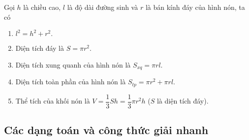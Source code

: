 \begin{dl}
Gọi $h$ là chiều cao, $l$ là độ dài đường sinh và $r$ là bán kính đáy của hình nón, ta có
\begin{enumerate}
\item $l^2=h^2+r^2.$
\item Diện tích đáy là $S=\pi r^2.$
\item Diện tích xung quanh của hình nón là $S_{xq}=\pi rl.$
\item Diện tích toàn phần của hình nón là $S_{tp}=\pi r^2+\pi rl.$
\item Thể tích của khối nón là $V=\dfrac{1}{3}Sh=\dfrac{1}{3}\pi r^2h$ ($S$ là diện tích đáy).
\end{enumerate}
\end{dl}

\subsection{Các dạng toán và công thức giải nhanh}

